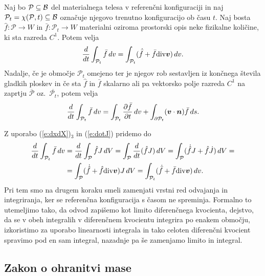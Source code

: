 \begin{izrek}
	Naj bo $\mathcal{P}\subseteq\mathcal B$ del materialnega telesa v referenčni konfiguraciji in naj
	$\mathcal{P}_t=\chi(\mathcal{P},t)\subseteq\mathcal B$ označuje njegovo trenutno konfiguracijo ob času $t$.
	Naj bosta $\hat{f}\colon\mathcal{P}\to W$ in $\bar{f}\colon\mathcal{P}_t\to W$
	materialni oziroma prostorski opis neke fizikalne količine, ki sta razreda $C^1$. Potem velja
	\begin{equation*}
		\frac{d}{dt}\int_{\mathcal{P}_t}\bar{f}\,dv =
		\int_{\mathcal{P}_t}(\dot{\bar{f}}+\bar{f}\mathrm{div}\boldsymbol v)\,dv.
	\end{equation*}
	Nadalje, če je območje $\mathcal{P}_t$ omejeno ter je njegov rob sestavljen iz končnega števila
	gladkih ploskev in če sta $\hat{f}$ in $\bar{f}$ skalarno ali pa vektorsko polje
	razreda $C^1$ na zaprtju $\overline{\mathcal{P}}$ oz.~$\overline{\mathcal{P}_t}$, potem velja
	\begin{equation*}
		\frac{d}{dt}\int_{\mathcal{P}_t}\bar{f}\,dv =
		\int_{\mathcal{P}_t}\frac{\partial\bar{f}}{\partial t}\,dv +
		\int_{\partial\mathcal{P}_t}(\boldsymbol v\cdot\boldsymbol n)\bar{f}\,ds.
	\end{equation*}
\end{izrek}
\proof
	Z uporabo (\ref{e:dxdX})${}_3$ in (\ref{e:dotJ}) pridemo do
	\begin{align*}
		\frac{d}{dt}\int_{\mathcal{P}_t}\bar{f}\,dv &= \frac{d}{dt}\int_{\mathcal{P}}\hat{f}J\,dV =
		\int_{\mathcal{P}}\frac{d}{dt}(\hat{f}J)\,dV = \int_{\mathcal{P}}(\dot{\hat{f}}J+\hat{f}\dot{J})\,dV =\\
		&=\int_{\mathcal{P}}(\dot{\hat{f}}+\hat{f}\mathrm{div}\boldsymbol v)J\,dV = \int_{\mathcal{P}_t}(\dot{\bar{f}}+\bar{f}\mathrm{div}\boldsymbol v)\,dv.
	\end{align*}
	Pri tem smo na drugem koraku smeli zamenjati vrstni red odvajanja in integriranja, ker se referenčna konfiguracija
	s časom ne spreminja. Formalno to utemeljimo tako, da odvod zapišemo kot limito diferenčnega kvocienta,
	dejstvo, da se v obeh integralih v diferenčnem kvocientu integrira po enakem območju, izkoristimo za uporabo
	linearnosti integrala in tako celoten diferenčni kvocient spravimo pod en sam integral, nazadnje pa še zamenjamo
	limito in integral.
\endproof


\subsection{Zakon o ohranitvi mase}


